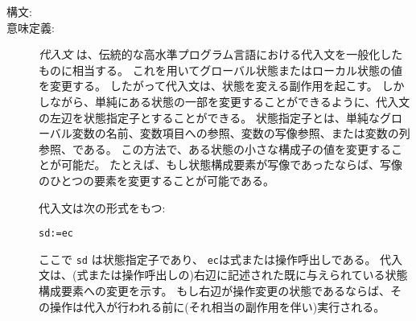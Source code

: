 \documentclass[\pformat,12pt]{jarticle}
\begin{document}
\begin{description}
\item[構文:]








\item[意味定義:]  {\it 代入文} は、伝統的な高水準プログラム言語における代入文を一般化したものに相当する。
これを用いてグローバル状態またはローカル状態の値を変更する。
したがって代入文は、状態を変える副作用を起こす。
しかしながら、単純にある状態の一部を変更することができるように、代入文の左辺を状態指定子とすることができる。
状態指定子とは、単純なグローバル変数の名前、変数項目への参照、変数の写像参照、または変数の列参照、である。
この方法で、ある状態の小さな構成子の値を変更することが可能だ。
たとえば、もし状態構成要素が写像であったならば、写像のひとつの要素を変更することが可能である。

 代入文は次の形式をもつ:
  \begin{alltt}
    sd := ec
  \end{alltt}
 ここで {\tt sd} は状態指定子であり、 {\tt ec}は式または操作呼出しである。
代入文は、(式または操作呼出しの)右辺に記述された既に与えられている状態構成要素への変更を示す。
もし右辺が操作変更の状態であるならば、その操作は代入が行われる前に(それ相当の副作用を伴い)実行される。 



\end{description}
\end{document}
